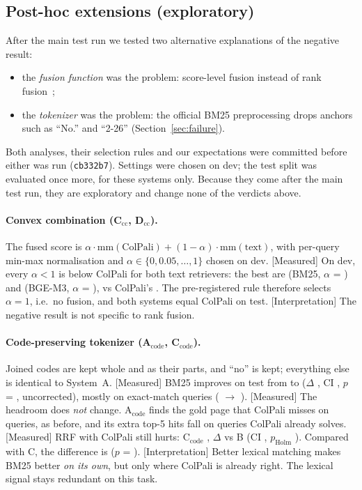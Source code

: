 \documentclass[11pt,a4paper]{article}
\newcommand{\lbl}[2]{\textsf{\scriptsize\textcolor{#1}{[#2]}}}
\newcommand{\Int}{\lbl{tagI}{Interpretation}}
\newcommand{\Mea}{\lbl{tagM}{Measured}}
\begin{document}
\FloatBarrier
\subsection{Post-hoc extensions (exploratory)}
\label{sec:posthoc}
After the main test run we tested two alternative explanations of the negative result:
\begin{itemize}
  \item the \emph{fusion function} was the problem: score-level fusion instead of rank fusion~\cite{bruch};
  \item the \emph{tokenizer} was the problem: the official BM25 preprocessing drops anchors such as ``No.'' and ``2-26'' (Section~\ref{sec:failure}).
\end{itemize}
Both analyses, their selection rules and our expectations were committed before either was run (\texttt{cb332b7}). Settings were chosen on dev; the test split was evaluated once more, for these systems only. Because they come after the main test run, they are exploratory and change none of the verdicts above.

\paragraph{Convex combination (C$_\text{cc}$, D$_\text{cc}$).} The fused score is $\alpha \cdot \mathrm{mm}(\text{ColPali}) + (1-\alpha) \cdot \mathrm{mm}(\text{text})$, with per-query min-max normalisation and $\alpha \in \{0, 0.05, \dots, 1\}$ chosen on dev.
\Mea{} On dev, every $\alpha < 1$ is below ColPali for both text retrievers: the best are \devBestBelowOneCcc{} (BM25, $\alpha$ = \devBestBelowOneAlphaCcc{}) and \devBestBelowOneDcc{} (BGE-M3, $\alpha$ = \devBestBelowOneAlphaDcc{}), vs ColPali's \devB{}. The pre-registered rule therefore selects $\alpha = 1$, i.e.\ no fusion, and both systems equal ColPali on test.
\Int{} The negative result is not specific to rank fusion.

\paragraph{Code-preserving tokenizer (A$_\text{code}$, C$_\text{code}$).} Joined codes are kept whole and as their parts, and ``no'' is kept; everything else is identical to System~A.
\Mea{} BM25 improves on test from \testA{} to \testAcode{} ($\Delta$ \deltaAcodeA{}, CI \deltaAcodeACI{}, $p$ = \pAcodeA{}, uncorrected), mostly on exact-match queries (\typeexactA{} $\rightarrow$ \typeexactAcode{}).
\Mea{} The headroom does \emph{not} change. A$_\text{code}$ finds the gold page that ColPali misses on \headAcodeOnly{} queries, as before, and its extra top-5 hits fall on queries ColPali already solves.
\Mea{} RRF with ColPali still hurts: C$_\text{code}$ \testCcode{}, $\Delta$ vs B \deltaCcode{} (CI \deltaCcodeCI{}, $p_\text{Holm}$ \pHolmCcode{}). Compared with C, the difference is \deltaCcodevsC{} ($p$ = \pCcodevsC{}).
\Int{} Better lexical matching makes BM25 better \emph{on its own}, but only where ColPali is already right. The lexical signal stays redundant on this task.
\end{document}
